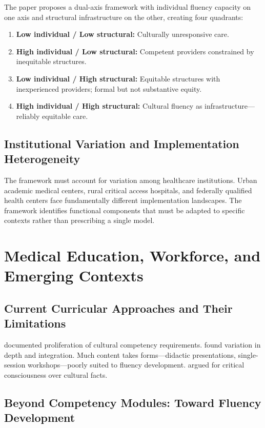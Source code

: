 \documentclass[12pt, a4paper]{article}
\begin{document}
The paper proposes a dual-axis framework with individual fluency capacity on one axis and structural infrastructure on the other, creating four quadrants:
\begin{enumerate}
    \item \textbf{Low individual / Low structural:} Culturally unresponsive care.
    \item \textbf{High individual / Low structural:} Competent providers constrained by inequitable structures.
    \item \textbf{Low individual / High structural:} Equitable structures with inexperienced providers; formal but not substantive equity.
    \item \textbf{High individual / High structural:} Cultural fluency as infrastructure---reliably equitable care.
\end{enumerate}

\subsection{Institutional Variation and Implementation Heterogeneity}

The framework must account for variation among healthcare institutions. Urban academic medical centers, rural critical access hospitals, and federally qualified health centers face fundamentally different implementation landscapes. The framework identifies functional components that must be adapted to specific contexts rather than prescribing a single model.

\section{Medical Education, Workforce, and Emerging Contexts}

\subsection{Current Curricular Approaches and Their Limitations}

\citet{jernigan2016} documented proliferation of cultural competency requirements. \citet{dogra2009} found variation in depth and integration. Much content takes forms---didactic presentations, single-session workshops---poorly suited to fluency development. \citet{kumagai2009} argued for critical consciousness over cultural facts.

\subsection{Beyond Competency Modules: Toward Fluency Development}
\end{document}

